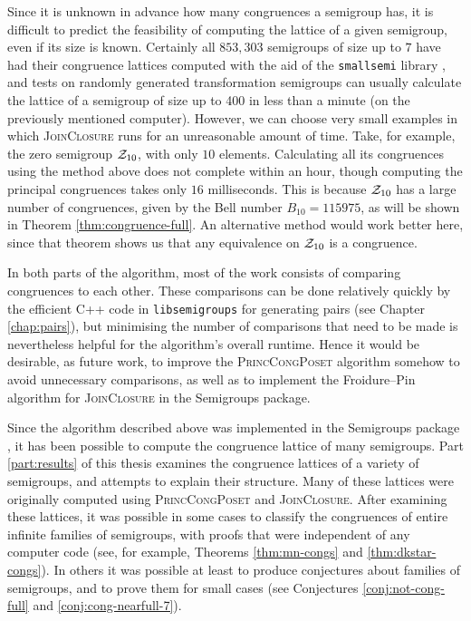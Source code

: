 Since it is unknown in advance how many congruences a semigroup has, it is
difficult to predict the feasibility of computing the lattice of a given
semigroup, even if its size is known.  Certainly all $853,303$ semigroups of
size up to $7$ have had their congruence lattices computed with the aid of the
\texttt{smallsemi} library \cite{smallsemi}, and tests on randomly generated
transformation semigroups can usually calculate the lattice of a semigroup of
size up to 400 in less than a minute (on the previously mentioned computer).
However, we can choose very small examples in which \textsc{JoinClosure} runs
for an unreasonable amount of time.  Take, for example, the zero semigroup
$\mathcal{Z}_{10}$, with only $10$ elements.  Calculating all its congruences using the
method above does not complete within an hour, though computing the principal
congruences takes only $16$ milliseconds.  This is because $\mathcal{Z}_{10}$ has a large
number of congruences, given by the Bell number $B_{10} = 115975$, as will be
shown in Theorem \ref{thm:congruence-full}.  An alternative method would work
better here, since that theorem shows us that any equivalence on $\mathcal{Z}_{10}$ is a
congruence.

In both parts of the algorithm, most of the work consists of comparing
congruences to each other.  These comparisons can be done relatively quickly by
the efficient C++ code in \texttt{libsemigroups} for generating pairs (see
Chapter \ref{chap:pairs}), but minimising the number of comparisons that need to
be made is nevertheless helpful for the algorithm's overall runtime.  Hence it
would be desirable, as future work, to improve the \textsc{PrincCongPoset}
algorithm somehow to avoid unnecessary comparisons, as well as to implement the
Froidure--Pin algorithm for \textsc{JoinClosure} in the Semigroups package.

Since the algorithm described above was implemented in the Semigroups package
\cite{semigroups}, it has been possible to compute the congruence lattice of
many semigroups.  Part \ref{part:results} of this thesis examines
the congruence lattices of a variety of semigroups, and attempts to explain
their structure.  Many of these lattices were originally computed using
\textsc{PrincCongPoset} and \textsc{JoinClosure}.  After examining these
lattices, it was possible in some cases to classify the congruences of entire
infinite families of semigroups, with proofs that were independent of any
computer code (see, for example, Theorems \ref{thm:mn-congs} and
\ref{thm:dkstar-congs}).  In others it was possible at least to produce
conjectures about families of semigroups, and to prove them for small cases (see
Conjectures \ref{conj:not-cong-full} and \ref{conj:cong-nearfull-7}).
